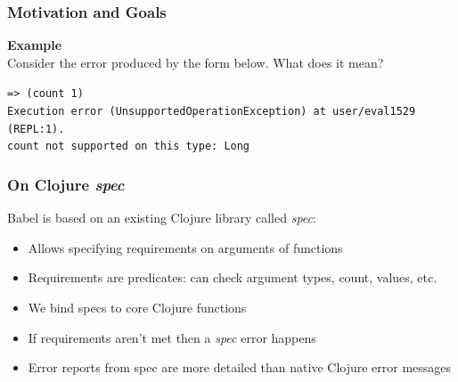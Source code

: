 \documentclass{beamer}
\begin{document}
\begin{frame}
    \frametitle{Motivation and Goals}
    \textbf{Example} \\
    Consider the error produced by the form below. What does it mean? \\

\vspace*{0.1in}

    \texttt{=> (count 1)} \\
    \texttt{Execution error (UnsupportedOperationException) at user/eval1529 (REPL:1).} \\
    \texttt{count not supported on this type: Long} \\
\end{frame}

\begin{frame}
    \frametitle{On Clojure \textit{spec}}
    Babel is based on an existing Clojure library called \textit{spec}:
    \begin{itemize}
        \item Allows specifying requirements on arguments of functions
        \item Requirements are predicates: can check argument types, count, values, etc.
        \item We bind specs to core Clojure functions
        \item If requirements aren't met then a \textit{spec} error happens
        \item Error reports from spec are more detailed than native Clojure error messages
    \end{itemize}
\end{frame}
\end{document}
